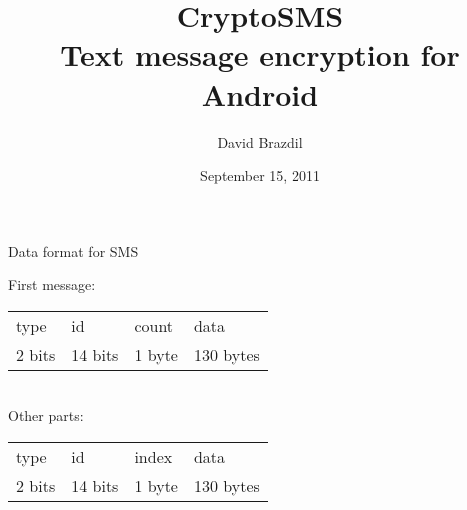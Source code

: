 \documentclass{beamer}
\title[CryptoSMS]{CryptoSMS\\Text message encryption for Android}
\author{David Brazdil}
\institute{University of Cambridge}
\date{September 15, 2011}
\begin{document}
\begin{frame}
\titlepage
\end{frame}

\begin{frame}{Data format for SMS}

First message: \\
%
\begin{tabularx}{\textwidth}{ |l|l|l|L| }
  \hline
  type    & id      & count   & data \\
  2 bits  & 14 bits & 1 byte  & 130 bytes  \\
  \hline
\end{tabularx} \newline
\\
Other parts: \\
%
\begin{tabularx}{\textwidth}{ |l|l|l|L| }
  \hline
  type    & id      & index   & data \\
  2 bits  & 14 bits & 1 byte  & 130 bytes  \\
  \hline
\end{tabularx}

\end{frame}
\end{document}

